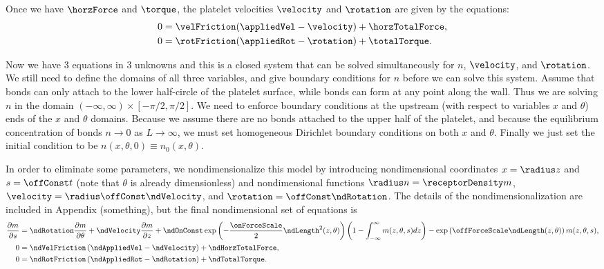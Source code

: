 Once we have $\horzForce$ and $\torque$, the platelet velocities
$\velocity$ and $\rotation$ are given by the equations:
\begin{align}
  \label{eq:force-balance}
  0 &= \velFriction (\appliedVel - \velocity) + \horzTotalForce, \\
  \label{eq:torque-balance}
  0 &= \rotFriction (\appliedRot - \rotation) + \totalTorque.
\end{align}

Now we have 3 equations in 3 unknowns and this is a closed system that
can be solved simultaneously for $n$, $\velocity$, and $\rotation$. We
still need to define the domains of all three variables, and give
boundary conditions for $n$ before we can solve this system. Assume
that bonds can only attach to the lower half-circle of the platelet
surface, while bonds can form at any point along the wall. Thus we are
solving $n$ in the domain $(-\infty, \infty) \times [-\pi/2,
\pi/2]$. We need to enforce boundary conditions at the upstream (with
respect to variables $x$ and $\theta$) ends of the $x$ and $\theta$
domains. Because we assume there are no bonds attached to the upper
half of the platelet, and because the equilibrium concentration of
bonds $n \rightarrow 0$ as $L \rightarrow \infty$, we must set
homogeneous Dirichlet boundary conditions on both $x$ and
$\theta$. Finally we just set the initial condition to be $n(x,
\theta, 0) \equiv n_0(x, \theta)$.

In order to eliminate some parameters, we nondimensionalize this model
by introducing nondimensional coordinates $x = \radius z$ and $s =
\offConst t$ (note that $\theta$ is already dimensionless) and
nondimensional functions $\radius n = \receptorDensity m$, $\velocity
= \radius \offConst \ndVelocity$, and $\rotation = \offConst
\ndRotation$. The details of the nondimensionalization are included in
Appendix (something), but the final nondimensional set of equations is
\begin{align}
  \label{eq:nd-bond-density}
  \frac{\partial m}{\partial s}
  &= \ndRotation \frac{\partial m}{\partial \theta} + \ndVelocity
    \frac{\partial m}{\partial z} + \ndOnConst \exp
    \left(-\frac{\onForceScale}{2} \ndLength^2(z, \theta) \right)
    \left(1 - \int_{-\infty}^{\infty} m(z, \theta, s) dz \right) -
    \exp \left(\offForceScale\ndLength(z, \theta)\right) m(z, \theta,
    s), \\
  \label{eq:nd-force-balance}
  0 &= \ndVelFriction \left(\ndAppliedVel - \ndVelocity\right) + 
      \ndHorzTotalForce, \\
  \label{eq:nd-torque-balance}
  0 &= \ndRotFriction \left(\ndAppliedRot - \ndRotation\right) +
      \ndTotalTorque.
\end{align}

